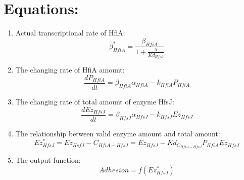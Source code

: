 \documentclass[UTF8]{ctexart}
\begin{document}
    \section{Equations:}
        \begin{enumerate}
        \item Actual transcriptional rate of HfiA: $$\beta_{HfiA}^{*} = \frac{\beta_{HfiA}}{1+\frac{X}{Kd_{HfiA}}}$$
        \item  The changing rate of HfiA amount: $$\frac{dP_{HfiA}}{dt} = \beta_{HfiA}\alpha_{HfiA} - k_{HfiA}P_{HfiA}$$
        \item  The changing rate of total amount of enzyme HfsJ: $$\frac{dEz_{HfsJ}}{dt}= \beta_{HfsJ}\alpha_{HfsJ} -  k_{HfsJ}Ez_{HfsJ}$$
        \item  The relationship between valid enzyme amount and total amount: $$Ez^{*}_{HfsJ} = Ez_{HsfJ}-C_{HfiA-HfsJ} = Ez_{HfsJ} - Kd_{C_{HfiA-HfsJ}}P_{HfiA}Ez_{HfsJ}$$
        \item  The output function: $$Adhesion = f(Ez^{*}_{HfsJ})$$
        \end{enumerate}
\end{document}

